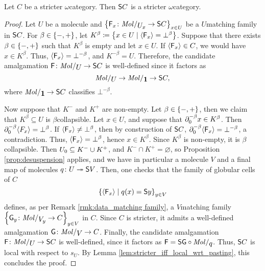 \begin{thm} \label{thm:suspension_of_stricter}
    Let \( C \) be a stricter \( \omega \)\nbd category.
    Then \( \sus{C} \) is a stricter \( \omega \)\nbd category.
\end{thm}
\begin{proof}
    Let \( U \) be a molecule and \( \set{\F_x \colon \molecin{\imel{U}{x}} \to \sus{C}}_{x \in U} \) be a \( U \)\nbd matching family in \( \sus{C} \).
    For \( \beta \in \set{-, +} \), let \( K^\beta \eqdef \set{x \in U \mid \pcell{\F_x} = \bot^\beta} \).
    Suppose that there exists \( \beta \in \set{-, +} \) such that \( K^\beta \) is empty and let \( x \in U \).
    If \( \pcell{\F_x} \in C \), we would have \( x \in K^\beta \).
    Thus, \( \pcell{\F_x} = \bot^{-\beta} \), and \( K^{-\beta} = U \).
    Therefore, the candidate amalgamation \( \F \colon \molecin{U} \to \sus{C} \) is well-defined since it factors as
    \begin{equation*}
        \molecin{U} \to \molecin{\pt} \to \sus{C},
    \end{equation*}
    where \( \molecin{\pt} \to \sus{C} \) classifies \( \bot^{-\beta} \).

    Now suppose that \( K^- \) and \( K^+ \) are non-empty.
    Let \( \beta \in \set{-, +} \), then we claim that \( K^\beta \subseteq U \) is \( \beta \)\nbd collapsible.
    Let \( x \in U \), and suppose that \( \bd{0}{-\beta} x \in K^\beta \).
    Then \( \bd{0}{-\beta} \pcell{F_x} = \bot^{\beta} \).
    If \( \pcell{\F_x} \neq \bot^\beta \), then by construction of \( \sus{C} \), \( \bd{0}{-\beta} \pcell{\F_x} = \bot^{-\beta} \), a contradiction.
    Thus, \( \pcell{\F_x} = \bot^\beta \), hence \( x \in K^\beta \).
    Since \( K^\beta \) is non-empty, it is \( \beta \)\nbd collapsible.
    Then  \( \gr{0}{U} \subseteq K^- \cup K^+ \), and \( K^- \cap K^+ = \varnothing \), so  Proposition \ref{prop:desuspension} applies, and we have in particular a molecule \( V \) and a final map of molecules \( q \colon U \surj \sus{V} \). 
    Then, one checks that the family of globular cells of \( C \)
    \begin{equation*}
        \set{\pcell{\F_x} \mid q(x) = \sus{y}}_{y \in V}
    \end{equation*} 
    defines, as per Remark \ref{rmk:data_matching family}, a \( V \)\nbd matching family \( \set{\G_y \colon \molecin{\imel{V}{y}} \to C}_{y \in V} \) in \( C \).
    Since \( C \) is stricter, it admits a well-defined amalgamation \( \G \colon \molecin{V} \to C \).
    Finally, the candidate amalgamation \( \F \colon \molecin{U} \to \sus{C} \) is well-defined, since it factors as \( \F = \sus{\G} \after \molecin{q} \).
    Thus, \( \sus{C} \) is local with respect to \( s_U \).
    By Lemma \ref{lem:stricter_iff_local_wrt_pasting}, this concludes the proof.
\end{proof}

